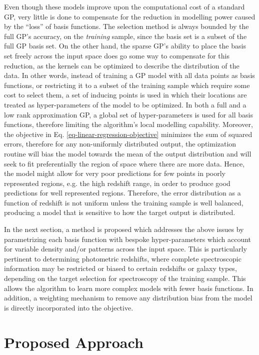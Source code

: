 \documentclass[useAMS,usenatbib,fleqn]{mn2e}
\begin{document}
Even though these models improve upon the computational cost of a standard GP, very little is done to compensate for the reduction in modelling power caused by the ``loss'' of basis functions. The selection method is always bounded by the full GP's accuracy, on the \emph{training} sample, since the basis set is a subset of the full GP basis set. On the other hand, the sparse GP's ability to place the basis set freely across the input space does go some way to compensate for this reduction, as the kernels can be optimized to describe the distribution of the data. In other words, instead of training a GP model with all data points as basis functions, or restricting it to a subset of the training sample which require some cost to select them, a set of inducing points is used in which their locations are treated as hyper-parameters of the model to be optimized. In both a full and a low rank approximation GP, a global set of hyper-parameters is used for all basis functions, therefore limiting the algorithm's local modelling capability. Moreover, the objective in Eq. \eqref{eq-linear-regression-objective} minimizes the sum of squared errors, therefore for any non-uniformly distributed output, the optimization routine will bias the model towards the mean of the output distribution and will seek to fit preferentially the region of space where there are more data. Hence, the model might allow for very poor predictions for few points in poorly represented regions, e.g. the high redshift range, in order to produce good predictions for well represented regions. Therefore, the error distribution as a function of redshift is not uniform unless the training sample is well balanced, producing a model that is sensitive to how the target output is distributed. 

In the next section, a method is proposed which addresses the above issues by parametrizing each basis function with bespoke hyper-parameters which account for variable density and/or patterns across the input space. This is particularly pertinent to determining photometric redshifts, where complete spectroscopic information may be restricted or biased to certain redshifts or galaxy types, depending on the target selection for spectroscopy of the training sample.
This allows the algorithm to learn more complex models with fewer basis functions. In addition, a weighting mechanism to remove any distribution bias from the model is directly incorporated into the objective.

\section{Proposed Approach}
\label{sec-proposed-approach}
\end{document}
